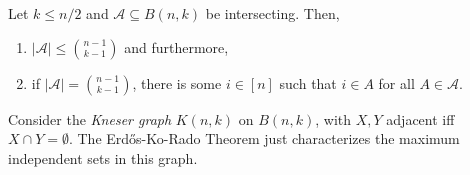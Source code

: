 \begin{ftheo}
	\label{ekr}
	Let $k \le n/2$ and $\mathcal{A} \subseteq B(n,k)$ be intersecting. Then,
	\begin{enumerate}[label=(\alph*)]
		\item $|\mathcal{A}| \le \binom{n-1}{k-1}$ and furthermore,
		\item if $|\mathcal{A}| = \binom{n-1}{k-1}$, there is some $i \in [n]$ such that $i \in A$ for all $A \in \mathcal{A}$.
	\end{enumerate}
\end{ftheo}


Consider the \emph{Kneser graph} $K(n,k)$ on $B(n,k)$, with $X,Y$ adjacent iff $X \cap Y = \emptyset$. The Erd\H{o}s-Ko-Rado Theorem just characterizes the maximum independent sets in this graph.

